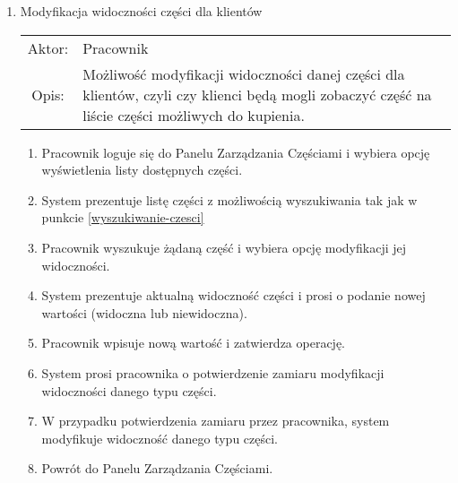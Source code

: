 \begin{enumerate}
  \item Modyfikacja widoczności części dla klientów \\
  \begin{tabularx}{\linewidth}{ c X }
  Aktor: & Pracownik \\
  Opis: & Możliwość modyfikacji widoczności danej części dla klientów, czyli czy klienci będą mogli zobaczyć część na liście części możliwych do kupienia.\\
  \end{tabularx}
   \begin{enumerate}
    \item Pracownik loguje się do Panelu Zarządzania Częściami i wybiera opcję wyświetlenia listy dostępnych części.
    \item System prezentuje listę części z możliwością wyszukiwania tak jak w punkcie \ref{wyszukiwanie-czesci}
    \item Pracownik wyszukuje żądaną część i wybiera opcję modyfikacji jej widoczności.
    \item System prezentuje aktualną widoczność części i prosi o podanie nowej wartości (widoczna lub niewidoczna).
    \item Pracownik wpisuje nową wartość i zatwierdza operację.
    \item System prosi pracownika o potwierdzenie zamiaru modyfikacji widoczności danego typu części.
    \item W przypadku potwierdzenia zamiaru przez pracownika, system modyfikuje widoczność danego typu części.
    \item Powrót do Panelu Zarządzania Częściami.
  \end{enumerate}
  

\end{enumerate}
